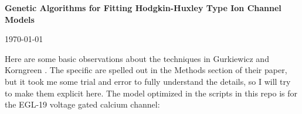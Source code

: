 \documentclass[11pt]{article}
\begin{document}
\thispagestyle{empty}

\begin{center}
{\LARGE \bf Genetic Algorithms for Fitting Hodgkin-Huxley Type Ion Channel Models}\\
\vspace{5pt}
\end{center}
\begin{center}
\vspace{-10pt}
\today
\end{center}

Here are some basic observations about the techniques in Gurkiewicz and Korngreen \cite{gurkiewicz2007numerical}.  The specific are spelled out in the Methods section of their paper, but it took me some trial and error to fully understand the details, so I will try to make them explicit here.  The model optimized in the scripts in this repo is for the EGL-19
voltage gated calcium channel:
\end{document}
